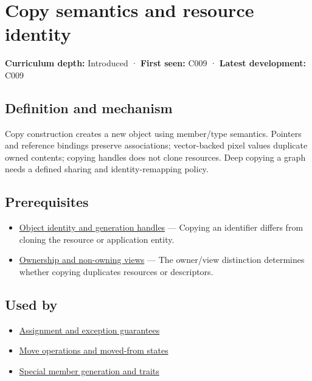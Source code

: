 \hypertarget{appendix-1340cd1ce582}{}\label{referencestart:appendix-1340cd1ce582}
\section{Copy semantics and resource identity}\label{appendix-1340cd1ce582-copy-semantics-and-resource-identity}

\textbf{Curriculum depth:} Introduced · \textbf{First seen:} C009 · \textbf{Latest development:} C009

\begin{allmightroledefinition}

\subsection{Definition and mechanism}\label{appendix-1340cd1ce582-definition-and-mechanism}

Copy construction creates a new object using member/type semantics. Pointers and reference bindings preserve associations; vector-backed pixel values duplicate owned contents; copying handles does not clone resources. Deep copying a graph needs a defined sharing and identity-remapping policy.

\end{allmightroledefinition}

\subsection{Prerequisites}\label{appendix-1340cd1ce582-prerequisites}

\begin{itemize}
\tightlist
\item
  \hyperref[appendix-f1581457d322]{Object identity and generation handles} --- Copying an identifier differs from cloning the resource or application entity.
\item
  \hyperref[appendix-d52e4486f527]{Ownership and non-owning views} --- The owner/view distinction determines whether copying duplicates resources or descriptors.
\end{itemize}

\subsection{Used by}\label{appendix-1340cd1ce582-used-by}

\begin{itemize}
\tightlist
\item
  \hyperref[appendix-bea6beb5350f]{Assignment and exception guarantees}
\item
  \hyperref[appendix-5636651017c2]{Move operations and moved-from states}
\item
  \hyperref[appendix-42e02a12c694]{Special member generation and traits}
\end{itemize}

